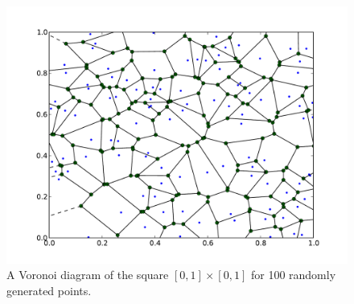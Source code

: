 \begin{figure}
\includegraphics[width=\textwidth]{voronoi_example_1.pdf}
\caption{A Voronoi diagram of the square $[0,1]\times [0,1]$ for 100 randomly generated points.}
\label{voronoi_ex_1}
\end{figure}

